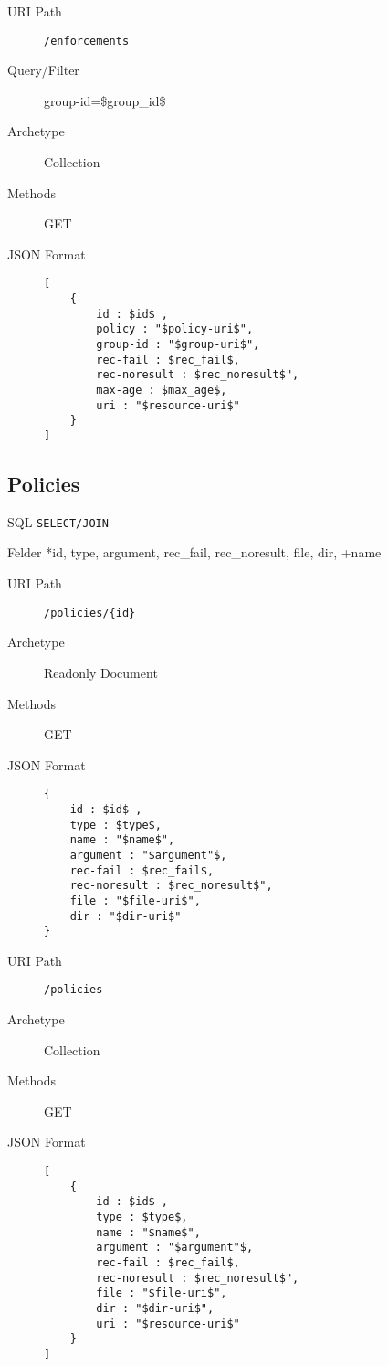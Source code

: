 \documentclass[10pt,a4paper]{scrartcl}
\begin{document}
\begin{mdframed}[style=def]
\begin{description}
	\item[URI Path] \texttt{/enforcements}
	\item[Query/Filter]	group-id=\$group\_id\$ 
	\item[Archetype] Collection
	\item[Methods] GET
	\item[JSON Format] \hfill
\begin{lstlisting}
[
    {
    	id : $id$ ,
    	policy : "$policy-uri$",
    	group-id : "$group-uri$",
    	rec-fail : $rec_fail$,
    	rec-noresult : $rec_noresult$", 
    	max-age : $max_age$,
    	uri : "$resource-uri$"
    }
]
\end{lstlisting}
\end{description}
\end{mdframed}


\pagebreak
\subsection{Policies}

\begin{description*}
    \item[SQL] \texttt{SELECT/JOIN}
    \item[Felder] *id, type, argument, rec\_fail, rec\_noresult, file, dir, +name
\end{description*}


\begin{mdframed}[style=def]
\begin{description}
	\item[URI Path] \texttt{/policies/\{id\}}
	\item[Archetype] Readonly Document
	\item[Methods] GET
	\item[JSON Format] \hfill
\begin{lstlisting}
{
	id : $id$ ,
	type : $type$,
	name : "$name$",
	argument : "$argument"$,
	rec-fail : $rec_fail$,
	rec-noresult : $rec_noresult$", 
	file : "$file-uri$",
	dir : "$dir-uri$"
}
\end{lstlisting}
\end{description}
\end{mdframed}

\begin{mdframed}[style=def]
\begin{description}
	\item[URI Path] \texttt{/policies}
	\item[Archetype] Collection
	\item[Methods] GET
	\item[JSON Format] \hfill
\begin{lstlisting}
[
    {
    	id : $id$ ,
    	type : $type$,
    	name : "$name$",
    	argument : "$argument"$,
    	rec-fail : $rec_fail$,
    	rec-noresult : $rec_noresult$", 
    	file : "$file-uri$",
    	dir : "$dir-uri$",
    	uri : "$resource-uri$"
    }
]
\end{lstlisting}
\end{description}
\end{mdframed}
\end{document}
